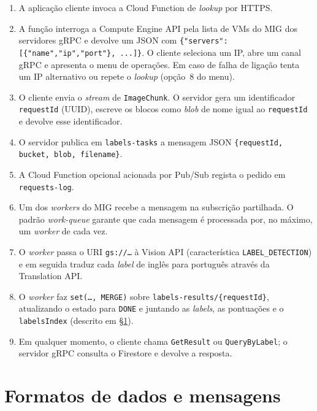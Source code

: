 \documentclass[11pt,a4paper]{article}
\begin{document}
\begin{enumerate}[leftmargin=1.6em,itemsep=2pt]
  \item A aplica\c{c}\~ao cliente invoca a Cloud Function de \emph{lookup}
        por HTTPS.
  \item A fun\c{c}\~ao interroga a Compute Engine API pela lista de VMs
        do MIG dos servidores gRPC e devolve um JSON com
        \texttt{\{"servers":[\{"name","ip","port"\}, ...]\}}.
        O cliente seleciona um IP, abre um canal gRPC e apresenta o
        menu de opera\c{c}\~oes. Em caso de falha de liga\c{c}\~ao tenta um IP
        alternativo ou repete o \emph{lookup} (op\c{c}\~ao~8 do menu).
  \item[3.1] O cliente envia o \emph{stream} de \texttt{ImageChunk}.
        O servidor gera um identificador \texttt{requestId} (UUID),
        escreve os blocos como \emph{blob} de nome igual ao
        \texttt{requestId} e devolve esse identificador.
  \item[3.2] O servidor publica em \texttt{labels-tasks} a mensagem JSON
        \texttt{\{requestId, bucket, blob, filename\}}.
  \item[4.0/5] A Cloud Function opcional acionada por Pub/Sub regista
        o pedido em \texttt{requests-log}.
  \item[4.1] Um dos \emph{workers} do MIG recebe a mensagem na
        subscri\c{c}\~ao partilhada. O padr\~ao \emph{work-queue} garante
        que cada mensagem \'e processada por, no m\'aximo, um
        \emph{worker} de cada vez.
  \item[4.2/6] O \emph{worker} passa o URI \texttt{gs://\dots} \`a Vision
        API (caracter\'istica \texttt{LABEL\_DETECTION}) e em seguida
        traduz cada \emph{label} de ingl\^es para portugu\^es atrav\'es da
        Translation API.
  \item[7] O \emph{worker} faz \texttt{set(\dots, MERGE)} sobre
        \texttt{labels-results/\{requestId\}}, atualizando o estado para
        \texttt{DONE} e juntando as \emph{labels}, as pontua\c{c}\~oes e o
        \texttt{labelsIndex} (descrito em \S\ref{sec:dados}).
  \item[8] Em qualquer momento, o cliente chama \texttt{GetResult} ou
        \texttt{QueryByLabel}; o servidor gRPC consulta o Firestore e
        devolve a resposta.
\end{enumerate}

\section{Formatos de dados e mensagens}
\label{sec:dados}
\end{document}
